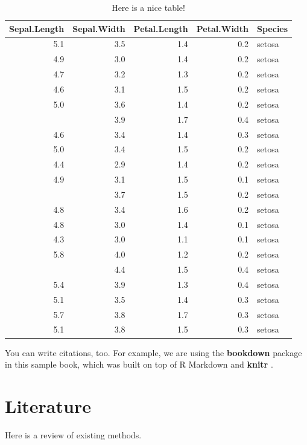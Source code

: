 \documentclass[]{krantz}
\begin{document}
\begin{table}

\caption{\label{tab:nice-tab}Here is a nice table!}
\centering
\begin{tabular}[t]{rrrrl}
\toprule
Sepal.Length & Sepal.Width & Petal.Length & Petal.Width & Species\\
\midrule
5.1 & 3.5 & 1.4 & 0.2 & setosa\\
4.9 & 3.0 & 1.4 & 0.2 & setosa\\
4.7 & 3.2 & 1.3 & 0.2 & setosa\\
4.6 & 3.1 & 1.5 & 0.2 & setosa\\
5.0 & 3.6 & 1.4 & 0.2 & setosa\\
\addlinespace
5.4 & 3.9 & 1.7 & 0.4 & setosa\\
4.6 & 3.4 & 1.4 & 0.3 & setosa\\
5.0 & 3.4 & 1.5 & 0.2 & setosa\\
4.4 & 2.9 & 1.4 & 0.2 & setosa\\
4.9 & 3.1 & 1.5 & 0.1 & setosa\\
\addlinespace
5.4 & 3.7 & 1.5 & 0.2 & setosa\\
4.8 & 3.4 & 1.6 & 0.2 & setosa\\
4.8 & 3.0 & 1.4 & 0.1 & setosa\\
4.3 & 3.0 & 1.1 & 0.1 & setosa\\
5.8 & 4.0 & 1.2 & 0.2 & setosa\\
\addlinespace
5.7 & 4.4 & 1.5 & 0.4 & setosa\\
5.4 & 3.9 & 1.3 & 0.4 & setosa\\
5.1 & 3.5 & 1.4 & 0.3 & setosa\\
5.7 & 3.8 & 1.7 & 0.3 & setosa\\
5.1 & 3.8 & 1.5 & 0.3 & setosa\\
\bottomrule
\end{tabular}
\end{table}

You can write citations, too. For example, we are using the \textbf{bookdown} package \citep{R-bookdown} in this sample book, which was built on top of R Markdown and \textbf{knitr} \citep{xie2015}.

\mainmatter

\hypertarget{literature}{%
\chapter{Literature}\label{literature}}

Here is a review of existing methods.
\end{document}
